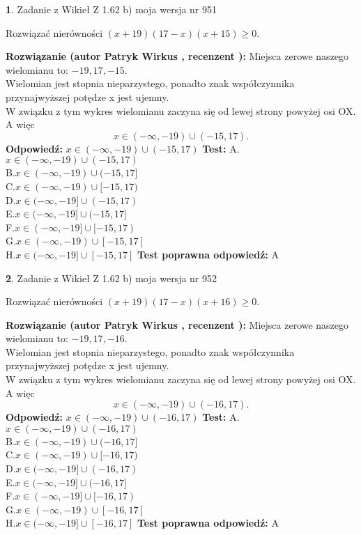 \documentclass[12pt, a4paper]{article}
\theoremstyle{definition} %
\newtheorem{zad}{}
\newcommand{\zadStart}[1]{\begin{zad}#1\newline}
\newcommand{\zadStop}{\end{zad}}
\newcommand{\rozwStart}[2]{\noindent \textbf{Rozwiązanie (autor #1 , recenzent #2): }\newline}
\newcommand{\rozwStop}{\newline}
\newcommand{\odpStart}{\noindent \textbf{Odpowiedź:}\newline}
\newcommand{\odpStop}{\newline}
\newcommand{\testStart}{\noindent \textbf{Test:}\newline}
\newcommand{\testStop}{\newline}
\newcommand{\kluczStart}{\noindent \textbf{Test poprawna odpowiedź:}\newline}
\newcommand{\kluczStop}{\newline}
\begin{document}
\zadStart{Zadanie z Wikieł Z 1.62 b) moja wersja nr 951}

Rozwiązać nierówności $(x+19)(17-x)(x+15)\ge0$.
\zadStop
\rozwStart{Patryk Wirkus}{}
Miejsca zerowe naszego wielomianu to: $-19, 17, -15$.\\
Wielomian jest stopnia nieparzystego, ponadto znak współczynnika przy\linebreak najwyższej potędze x jest ujemny.\\ W związku z tym wykres wielomianu zaczyna się od lewej strony powyżej osi OX. A więc $$x \in (-\infty,-19) \cup (-15,17).$$
\rozwStop
\odpStart
$x \in (-\infty,-19) \cup (-15,17)$
\odpStop
\testStart
A.$x \in (-\infty,-19) \cup (-15,17)$\\
B.$x \in (-\infty,-19) \cup (-15,17]$\\
C.$x \in (-\infty,-19) \cup [-15,17)$\\
D.$x \in (-\infty,-19] \cup (-15,17)$\\
E.$x \in (-\infty,-19] \cup (-15,17]$\\
F.$x \in (-\infty,-19] \cup [-15,17)$\\
G.$x \in (-\infty,-19) \cup [-15,17]$\\
H.$x \in (-\infty,-19] \cup [-15,17]$
\testStop
\kluczStart
A
\kluczStop



\zadStart{Zadanie z Wikieł Z 1.62 b) moja wersja nr 952}

Rozwiązać nierówności $(x+19)(17-x)(x+16)\ge0$.
\zadStop
\rozwStart{Patryk Wirkus}{}
Miejsca zerowe naszego wielomianu to: $-19, 17, -16$.\\
Wielomian jest stopnia nieparzystego, ponadto znak współczynnika przy\linebreak najwyższej potędze x jest ujemny.\\ W związku z tym wykres wielomianu zaczyna się od lewej strony powyżej osi OX. A więc $$x \in (-\infty,-19) \cup (-16,17).$$
\rozwStop
\odpStart
$x \in (-\infty,-19) \cup (-16,17)$
\odpStop
\testStart
A.$x \in (-\infty,-19) \cup (-16,17)$\\
B.$x \in (-\infty,-19) \cup (-16,17]$\\
C.$x \in (-\infty,-19) \cup [-16,17)$\\
D.$x \in (-\infty,-19] \cup (-16,17)$\\
E.$x \in (-\infty,-19] \cup (-16,17]$\\
F.$x \in (-\infty,-19] \cup [-16,17)$\\
G.$x \in (-\infty,-19) \cup [-16,17]$\\
H.$x \in (-\infty,-19] \cup [-16,17]$
\testStop
\kluczStart
A
\kluczStop
\end{document}
